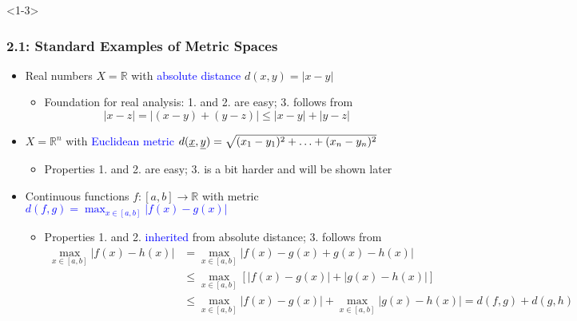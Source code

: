 \documentclass[10pt,english,aspectratio=169,handout]{beamer}
\begin{document}
\begin{frame}<1-3> \frametitle{2.1: Standard Examples of Metric Spaces}

\begin{itemize}
\setlength\itemsep{6mm}
\item<1-> Real numbers $X=\mathbb{R}$ with \textcolor{blue}{absolute distance} $d(x,y)=|x-y|$ \vspace{1mm}
\begin{itemize} 
  \setlength\itemsep{1.5mm}
  \item Foundation for real analysis: 1. and 2. are easy; 3. follows from \[ |x-z| = |(x-y) + (y-z)| \leq |x-y| + |y-z| \]
\end{itemize}

\item<2-> $X=\mathbb{R}^n$ with \textcolor{blue}{Euclidean metric $d(\underline{x},\underline{y})=\sqrt{(x_1-y_1)^2 + \ldots + (x_n-y_n)^2}\!\!\!\!\!\!$}\vspace{1mm}
\begin{itemize} 
  \setlength\itemsep{1.5mm}
  \item Properties 1. and 2. are easy; 3. is a bit harder and will be shown later
\end{itemize}

\item<3-> Continuous functions $f \colon [a,b] \to \mathbb{R}$ with metric \textcolor{blue}{$d(f,g) = \displaystyle{\max_{x\in [a,b]}} | f(x) - g(x) |\!\!\!\!\!\!\!\!\!\!\!\!\!\!\!\!\!\!\!\!\!$}\vspace{0.5mm}
\begin{itemize} 
  \setlength\itemsep{1.5mm}
  \item Properties 1. and 2. \textcolor{blue}{inherited} from absolute distance; 3. follows from
  \begin{align*}
    \max_{x\in [a,b]} | f(x) - h(x) |
    &= \max_{x\in [a,b]} | f(x) - g(x) + g(x) - h(x) |  \\
    &\leq \max_{x\in [a,b]} \left[ |f(x) - g(x)| + |g(x) - h(x)| \right] \\
    &\leq \max_{x\in [a,b]} |f(x) - g(x)| + \max_{x\in [a,b]} |g(x) - h(x)| = d(f,g) + d(g,h)
  \end{align*}
\end{itemize}


\end{itemize}
\end{frame}
\end{document}
